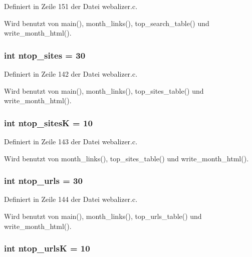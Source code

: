 Definiert in Zeile 151 der Datei webalizer.c.

Wird benutzt von main(), month\_\-links(), top\_\-search\_\-table() und write\_\-month\_\-html().
\subsubsection{\setlength{\rightskip}{0pt plus 5cm}int {\bf ntop\_\-sites} = 30}\label{webalizer_8c_57531d5f29d4cbdaac1f25e52f4a069d}




Definiert in Zeile 142 der Datei webalizer.c.

Wird benutzt von main(), month\_\-links(), top\_\-sites\_\-table() und write\_\-month\_\-html().
\subsubsection{\setlength{\rightskip}{0pt plus 5cm}int {\bf ntop\_\-sites\-K} = 10}\label{webalizer_8c_a3069c260eedec99be29617d90fa687a}




Definiert in Zeile 143 der Datei webalizer.c.

Wird benutzt von month\_\-links(), top\_\-sites\_\-table() und write\_\-month\_\-html().
\subsubsection{\setlength{\rightskip}{0pt plus 5cm}int {\bf ntop\_\-urls} = 30}\label{webalizer_8c_a450ef7a6e4e6148f9cb184144a7c8cc}




Definiert in Zeile 144 der Datei webalizer.c.

Wird benutzt von main(), month\_\-links(), top\_\-urls\_\-table() und write\_\-month\_\-html().
\subsubsection{\setlength{\rightskip}{0pt plus 5cm}int {\bf ntop\_\-urls\-K} = 10}\label{webalizer_8c_21acc4795c6bb4027a1bd2ad038fe3fa}




